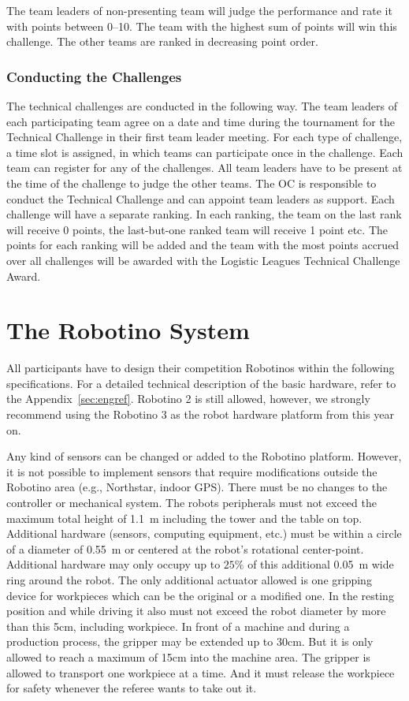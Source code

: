 \documentclass[12pt,twoside]{article}
\begin{document}
The team leaders of non-presenting team will judge the performance and
rate it with points between 0--10.  The team with the highest sum of
points will win this challenge. The other teams are ranked in
decreasing point order.

\subsubsection{Conducting the Challenges~}
The technical challenges are conducted in the following way. The team
leaders of each participating team agree on a date and time during the
tournament for the Technical Challenge in their first team leader
meeting. For each type of challenge, a time slot is assigned, in which
teams can participate once in the challenge. Each team can register
for any of the challenges. All team leaders have to be present at the
time of the challenge to judge the other teams. The OC is responsible
to conduct the Technical Challenge and can appoint team leaders as
support. Each challenge will have a separate ranking. In each ranking,
the team on the last rank will receive 0 points, the last-but-one
ranked team will receive 1 point etc. The points for each ranking will
be added and the team with the most points accrued over all challenges
will be awarded with the Logistic Leagues Technical Challenge Award.


\section{The Robotino System}
\label{sec:robotino}

All participants have to design their competition Robotinos within the
following specifications. For a detailed technical description of the
basic hardware, refer to the Appendix~\ref{sec:engref}. Robotino 2 is
still allowed, however, we strongly recommend using the Robotino 3 as
the robot hardware platform from this year on.

Any kind of sensors can be changed or added to the Robotino platform.
However, it is not possible to implement sensors that require
modifications outside the Robotino area (e.g., Northstar, indoor GPS).
There must be no changes to the controller or mechanical system.
The robots peripherals must not exceed the maximum total height of
\SI{1.1}{\metre} including the tower and the table on top. Additional
hardware (sensors, computing equipment, etc.)  must be within a circle
of a diameter of \SI{0.55}{\metre} or centered at the robot's rotational
center-point. Additional hardware may only occupy up to $25\%$ of this
additional \SI{0.05}{\metre} wide ring around the
robot. The only additional actuator allowed is one gripping device for
workpieces which can be the original or a modified one. In the resting
position and while driving it also must not exceed the robot diameter by
more than this 5cm, including workpiece.
In front of a machine and during a production process, the gripper may
be extended up to 30cm. But it is only allowed to reach a maximum of
15cm into the machine area.
The gripper is allowed to transport one workpiece at a time. And it must
release the workpiece for safety whenever the referee wants to take out it.
\end{document}
